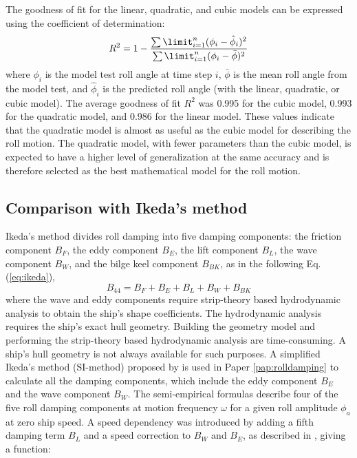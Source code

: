 \noindent The goodness of fit for the linear, quadratic, and cubic models can be expressed using the coefficient of determination:
\begin{equation} \label{eq:R2}
R^2=1-\frac{\sum\limit_{i=1}^{n}(\phi_{i}-\hat{\phi}_i)^2}{\sum\limit_{i=1}^{n}(\phi_i-\bar \phi)^2}
\end{equation}
where $\phi_i$ is the model test roll angle at time step $i$, $\bar \phi$ is the mean roll angle from the model test, and $\hat{\phi}_i$ is the predicted roll angle (with the linear, quadratic, or cubic model). The average goodness of fit $R^2$ was 0.995 for the cubic model, 0.993 for the quadratic model, and 0.986 for the linear model. These values indicate that the quadratic model is almost as useful as the cubic model for describing the roll motion. The quadratic model, with fewer parameters than the cubic model, is expected to have a higher level of generalization at the same accuracy and is therefore selected as the best mathematical model for the roll motion. 

\subsection{Comparison with Ikeda's method}
Ikeda's method divides roll damping into five damping components: the friction component $B_F$, the eddy component $B_E$, the lift component $B_L$, the wave component $B_W$, and the bilge keel component $B_{BK}$, as in the following Eq.(\ref{eq:ikeda}), 
\begin{equation} \label{eq:ikeda}
B_{44} = B_F + B_E + B_L + B_W + B_{BK}
\end{equation}
where the wave and eddy components require strip-theory based hydrodynamic analysis to obtain the ship's shape coefficients. The hydrodynamic analysis requires the ship's exact hull geometry. Building the geometry model and performing the strip-theory based hydrodynamic analysis are time-consuming. A ship's hull geometry is not always available for such purposes. A simplified Ikeda's method (SI-method) proposed by \parencite{kawahara_simple_2011} is used in Paper \ref{pap:rolldamping} to calculate all the damping components, which include the eddy component $B_E$ and the wave component $B_W$. The semi-empirical formulas describe four of the five roll damping components at motion frequency $\omega$ for a given roll amplitude $\phi_a$ at zero ship speed. A speed dependency was introduced by adding a fifth damping term $B_L$ and a speed correction to $B_W$ and $B_E$, as described in \parencite{ikeda_velocity_1979}, giving a function: 


